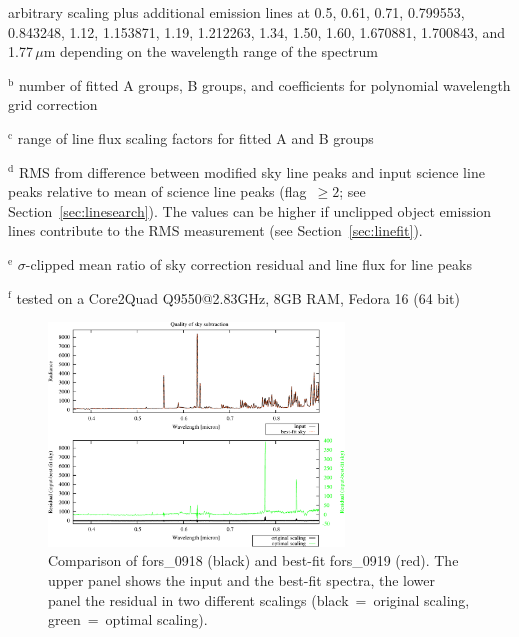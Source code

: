 \begin{table}
\begin{list}{}{}
arbitrary scaling plus additional emission lines at 0.5, 0.61, 0.71, 0.799553,
0.843248, 1.12, 1.153871, 1.19, 1.212263, 1.34, 1.50, 1.60, 1.670881, 1.700843,
and 1.77\,$\mu$m depending on the wavelength range of the spectrum
\item[$^\mathrm{b}$] number of fitted A groups, B groups, and coefficients for
polynomial wavelength grid correction
\item[$^\mathrm{c}$] range of line flux scaling factors for fitted A and B
groups
\item[$^\mathrm{d}$] RMS from difference between modified sky line peaks and
input science line peaks relative to mean of science line peaks (flag~$\ge 2$;
see Section~\ref{sec:linesearch}). The values can be higher if unclipped object
emission lines contribute to the RMS measurement (see
Section~\ref{sec:linefit}).
\item[$^\mathrm{e}$] $\sigma$-clipped mean ratio of sky correction residual and
line flux for line peaks
\item[$^\mathrm{f}$] tested on a Core2Quad Q9550@2.83GHz, 8GB RAM, Fedora 16
(64 bit)
\end{list}
\end{table}

\begin{figure}
\centering
\includegraphics[width=0.7\textwidth,clip=true]{figures/TEST-FORS-1_fit.pdf}
\caption[]{Comparison of fors\_0918 (black) and best-fit fors\_0919 (red). The
upper panel shows the input and the best-fit spectra, the lower panel the
residual in two different scalings (black~=~original scaling, green~=~optimal
scaling).}
\label{fig:fors_1}
\end{figure}

